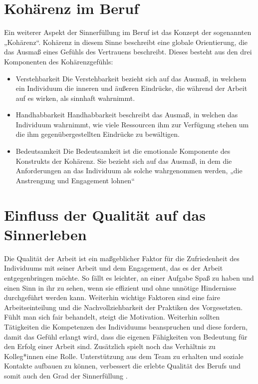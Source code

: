\section{Kohärenz im Beruf}
Ein weiterer Aspekt der Sinnerfüllung im Beruf ist das Konzept der sogenannten „Kohärenz“. Kohärenz in diesem Sinne beschreibt eine globale Orientierung, die das Ausmaß eines Gefühls des Vertrauens beschreibt. Dieses besteht aus den drei Komponenten des Kohärenzgefühls:
\begin{itemize}
    \item Verstehbarkeit\newline
    Die Verstehbarkeit bezieht sich auf das Ausmaß, in welchem ein Individuum die inneren und äußeren Eindrücke, die während der Arbeit auf es wirken, als sinnhaft wahrnimmt.
    \item Handhabbarkeit\newline
    Handhabbarkeit beschreibt das Ausmaß, in welchen das Individuum wahrnimmt, wie viele Ressourcen ihm zur Verfügung stehen um die ihm gegenübergestellten Eindrücke zu bewältigen.
    \item Bedeutsamkeit\newline
    Die Bedeutsamkeit ist die emotionale Komponente des Konstrukts der Kohärenz. Sie bezieht sich auf das Ausmaß, in dem die Anforderungen an das Individuum als solche wahrgenommen werden, „die Anstrengung und Engagement lohnen“
\end{itemize}
\cite[S.201]{FluterHoffmann.2018}\newline
\section{Einfluss der Qualität auf das Sinnerleben}
Die Qualität der Arbeit ist ein maßgeblicher Faktor für die Zufriedenheit des Individuums mit seiner Arbeit und dem Engagement, das es der Arbeit entgegenbringen möchte. So fällt es leichter, an einer Aufgabe Spaß zu haben und einen Sinn in ihr zu sehen, wenn sie effizient und ohne unnötige Hindernisse durchgeführt werden kann. Weiterhin wichtige Faktoren sind eine faire Arbeitseinteilung und die Nachvollziehbarkeit der Praktiken des Vorgesetzten. Fühlt man sich fair behandelt, steigt die Motivation. Weiterhin sollten Tätigkeiten die Kompetenzen des Individuums beanspruchen und diese fordern, damit das Gefühl erlangt wird, dass die eigenen Fähigkeiten von Bedeutung für den Erfolg einer Arbeit sind. Zusätzlich spielt noch das Verhältnis zu Kolleg*innen eine Rolle. Unterstützung aus dem Team zu erhalten und soziale Kontakte aufbauen zu können, verbessert die erlebte Qualität des Berufs und somit auch den Grad der Sinnerfüllung \cite[S.194]{Voswinkel.2018}\cite[S.205-206]{FluterHoffmann.2018}.
